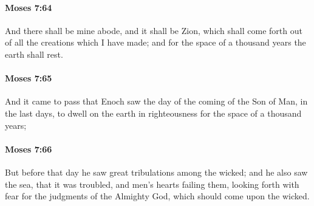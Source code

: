 		\paragraph{Moses 7:64} %
			\label{MOSES-7-64}

			And there shall be mine abode, and it shall be Zion, which shall come forth out of all the creations which I have made; and for the space of a thousand years the earth shall rest.


		\paragraph{Moses 7:65} %
			\label{MOSES-7-65}

			And it came to pass that Enoch saw the day of the coming of the Son of Man, in the last days, to dwell on the earth in righteousness for the space of a thousand years;


		\paragraph{Moses 7:66} %
			\label{MOSES-7-66}

			But before that day he saw great tribulations among the wicked; and he also saw the sea, that it was troubled, and men's hearts failing them, looking forth with fear for the judgments of the Almighty God, which should come upon the wicked.


